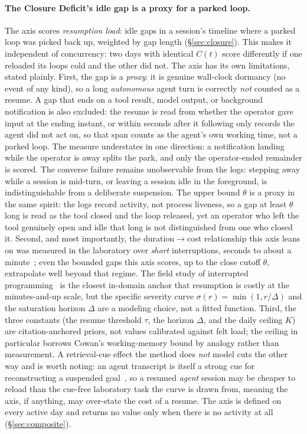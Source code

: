 \documentclass[10pt,twocolumn]{article}
\begin{document}
\paragraph{The Closure Deficit's idle gap is a proxy for a parked loop.}
The axis scores \emph{resumption load}: idle gaps in a session's timeline where a
parked loop was picked back up, weighted by gap length (\S\ref{sec:closure}). This
makes it independent of concurrency: two days with identical $C(t)$ score
differently if one reloaded its loops cold and the other did not. The axis has
its own limitations, stated plainly. First, the gap is a \emph{proxy}: it is
genuine wall-clock dormancy (no event of any kind), so a long \emph{autonomous}
agent turn is correctly \emph{not} counted as a resume. A gap that ends on a tool
result, model output, or background notification is also excluded: the resume is
read from whether the operator gave input at the ending instant, or within seconds
after it following only records the agent did not act on, so that span
counts as the agent's own working time, not a parked loop. The measure
understates in one direction: a notification landing while the operator is away
splits the park, and only the operator-ended remainder is scored. The converse
failure remains unobservable from the logs: stepping away while a
session is mid-turn, or leaving a session idle in the foreground, is
indistinguishable from a deliberate suspension. The upper bound $\theta$ is a proxy in the same
spirit: the logs record activity, not process liveness, so a gap at least $\theta$
long is read as the tool closed and the loop released, yet an operator who left
the tool genuinely open and idle that long is not distinguished from one who
closed it. Second, and most importantly, the
duration$\to$cost relationship this axis leans on was measured in the laboratory
over \emph{short} interruptions, seconds to about a minute~\cite{monk2008,altmann2002};
even the bounded gaps this axis scores, up to the close cutoff $\theta$, extrapolate
well beyond that regime. The field study of interrupted programming~\cite{parnin2011} is
the closest in-domain anchor that resumption is costly at the minutes-and-up scale,
but the specific severity curve $\sigma(r)=\min(1,r/\Delta)$ and the saturation
horizon $\Delta$ are a modeling choice, not a fitted function. Third, the three
constants (the resume threshold $\tau$, the horizon $\Delta$, and the daily
ceiling $K$) are citation-anchored priors, not values calibrated against felt
load; the ceiling in particular borrows Cowan's working-memory bound by analogy
rather than measurement. A retrieval-cue effect the method does \emph{not} model cuts the
other way and is worth noting: an agent transcript is itself a strong cue for
reconstructing a suspended goal~\cite{altmann2002}, so a resumed \emph{agent}
session may be cheaper to reload than the cue-free laboratory task the curve is
drawn from, meaning the axis, if anything, may over-state the cost of a resume.
The axis is defined on every active day and returns no value only when there
is no activity at all (\S\ref{sec:composite}).
\end{document}
